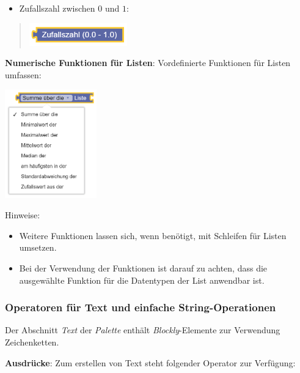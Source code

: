 \documentclass[
  letterpaper,
  DIV=11]{scrreprt}
\providecommand{\tightlist}{%
  \setlength{\itemsep}{0pt}\setlength{\parskip}{0pt}}\usepackage{longtable,booktabs,array}
\begin{document}
\begin{tcolorbox}
\begin{itemize}
\tightlist
\item
  Zufallszahl zwischen \(0\) und \(1\):
\end{itemize}

\begin{quote}
\includegraphics[width=1.66667in,height=\textheight]{img/screenshot-blockly-math-function-random-number-zero-one-01-DEU.png}
\end{quote}

\textbf{Numerische Funktionen für Listen}: Vordefinierte Funktionen für
Listen umfassen:

\includegraphics[width=1.5625in,height=\textheight]{img/screenshot-blockly-math-functions-for-lists-01-DEU.png}

Hinweise:

\begin{itemize}
\item
  Weitere Funktionen lassen sich, wenn benötigt, mit Schleifen für
  Listen umsetzen.
\item
  Bei der Verwendung der Funktionen ist darauf zu achten, dass die
  ausgewählte Funktion für die Datentypen der List anwendbar ist.
\end{itemize}

\hypertarget{operatoren-fuxfcr-text-und-einfache-string-operationen-1}{%
\subsubsection{Operatoren für Text und einfache
String-Operationen}\label{operatoren-fuxfcr-text-und-einfache-string-operationen-1}}

Der Abschnitt \emph{Text} der \emph{Palette} enthält
\emph{Blockly}-Elemente zur Verwendung Zeichenketten.

\textbf{Ausdrücke}: Zum erstellen von Text steht folgender Operator zur
Verfügung:


\end{tcolorbox}
\end{document}

